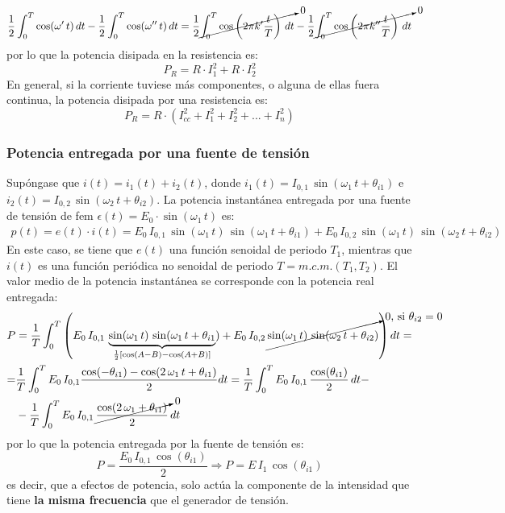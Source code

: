 \documentclass[11pt]{book} %
\begin{document}
\begin{equation*}
    \dfrac{1}{2}\int_0^T\cos(\omega'\,t)\,dt-\dfrac{1}{2}\int_0^T\cos(\omega''\,t)\,dt=\dfrac{1}{2}\cancelto{0}{\int_0^T \cos\left(2\pi k'\dfrac{t}{T}\right)\,dt}-\dfrac{1}{2}\cancelto{0}{\int_0^T\cos\left(2\pi k''\dfrac{t}{T}\right)\,dt}
\end{equation*}
por lo que la potencia disipada en la resistencia es:
\begin{equation*}
   P_R=R\cdot I_1^2+R\cdot I_2^2
\end{equation*}
En general, si la corriente tuviese más componentes, o alguna de ellas fuera continua, la potencia disipada por una resistencia es:
\begin{equation}\label{eq.P_R_superposicion}
    \boxed{P_R=R\cdot\left(I_{cc}^2+I_1^2+I_2^2+...+I_n^2 \right)}
\end{equation}

    \subsubsection{Potencia entregada por una fuente de tensión}
    
    Supóngase que $i(t) = i_1(t) + i_2(t)$, donde $i_1(t)=I_{0,1}\,\sin(\omega_1\,t+\theta_{i1})$ e $i_2(t)=I_{0,2}\,\sin(\omega_2\,t+\theta_{i2})$. La potencia instantánea entregada por una fuente de tensión de fem $\epsilon(t)=E_0\cdot\sin(\omega_1\,t)$ es:
\begin{align*}
  p(t) = e(t)\cdot i(t) = E_0\, I_{0,1}\,\sin(\omega_1\,t)\,\sin(\omega_1\,t+\theta_{i1}) + E_0\, I_{0,2}\,\sin(\omega_1\,t)\,\sin(\omega_2\,t+\theta_{i2})
\end{align*} 
En este caso, se tiene que $e(t)$ una función senoidal de periodo $T_1$, mientras que $i(t)$ es una función periódica no senoidal de periodo $T=m.c.m.(T_1,T_2)$. El valor medio de la potencia instantánea se corresponde con la potencia real entregada:
\begin{align*}
    P&=\dfrac{1}{T}\int_0^{T}\left( E_0\, I_{0,1}\,\underbrace{\sin(\omega_1\,t)\,\sin(\omega_1\,t+\theta_{i1}}_{\frac{1}{2}\left[\cos(A-B)-\cos(A+B)\right]}) + E_0\, I_{0,2}\,\cancelto{\text{0, si $\theta_{i2}=0$}}{\sin(\omega_1\,t)\,\sin(\omega_2\,t+\theta_{i2})}\right)dt=\\
    =&\dfrac{1}{T}\int_0^T E_0\,I_{0,1}\dfrac{\cos(-\theta_{i1})-\cos(2\,\omega_1\,t+\theta_{i1})}{2}dt =\dfrac{1}{T}\int_0^T E_0\,I_{0,1}\,\dfrac{\cos(\theta_{i1})}{2}\,dt-\\
    &-\dfrac{1}{T}\int_0^T E_0\,I_{0,1}\,\cancelto{0}{\dfrac{\cos(2\,\omega_1+\theta_{i1})}{2}}\,dt
\end{align*}
por lo que la potencia entregada por la fuente de tensión es:
\begin{equation}\label{eq.P_E_superposicion}
    P=\dfrac{E_0\,I_{0,1}\,\cos(\theta_{i1})}{2}\Rightarrow \boxed{P=E\,I_1\,\cos(\theta_{i1})}
\end{equation}
es decir, que a efectos de potencia, solo actúa la componente de la intensidad que tiene \textbf{la misma frecuencia} que el generador de tensión.
\end{document}
